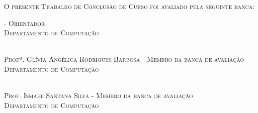 \begin{folhadeaprovacao}
	\vspace*{40pt}
	
	\begin{center}
		{\normalfont\scshape O presente Trabalho de Conclus\~ao de Curso foi avaliado pela seguinte banca:}\\
	\end{center}
	
	\vspace*{10pt}
	
	\begin{center}
		{\normalfont\scshape\imprimirorientador - Orientador}\\
		{\normalfont\scshape Departamento de Computa\c{c}\~ao}\\
		{\normalfont\scshape\imprimirinstituicao}\\
	\end{center}
	
	\vspace*{3pt}
	
	\begin{center}
		{\normalfont\scshape Profª. Glívia Angélica Rodrigues Barbosa - Membro da banca de avalia\c{c}\~ao}\\
		{\normalfont\scshape Departamento de Computa\c{c}\~ao}\\
		{\normalfont\scshape\imprimirinstituicao}\\
	\end{center}
	
	\vspace*{3pt}
	
	\begin{center}
		{\normalfont\scshape Prof. Ismael Santana Silva - Membro da banca de avalia\c{c}\~ao}\\
		{\normalfont\scshape Departamento de Computa\c{c}\~ao}\\
		{\normalfont\scshape\imprimirinstituicao}\\
	\end{center}
	
\end{folhadeaprovacao}
\makeatother
